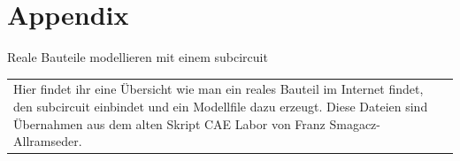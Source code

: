 \section{Appendix}

\begin{frame}[t]{Reale Bauteile modellieren mit einem subcircuit} 
    
    \begin{spacing}{0.9} \begin{tiny}
      \begin{table}[h!]
        \begin{tabular}{p{5cm} p{5cm}}
            \begin{minipage}{0.5\textwidth}
                Hier findet ihr eine Übersicht wie man ein reales Bauteil im Internet findet,
                den subcircuit einbindet und ein Modellfile dazu erzeugt. Diese Dateien sind Übernahmen
                aus dem alten Skript CAE Labor von Franz Smagacz-Allramseder. \newline


\end{minipage}
\end{tabular}
\end{table}
\end{tiny}
\end{spacing}
\end{frame}
